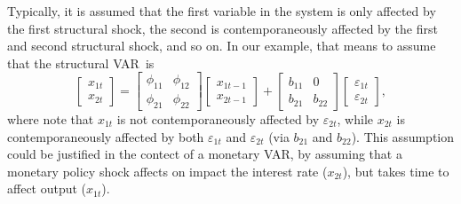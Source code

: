 \documentclass[10pt]{article}
\begin{document}
Typically, it is assumed that the first variable in the system is only
affected by the first structural shock, the second is contemporaneously
affected by the first and second structural shock, and so on. In our
example, that means to assume that the structural VAR\ is 
\begin{equation}
\left[ 
\begin{array}{c}
x_{1t} \\ 
x_{2t}%
\end{array}%
\right] =%
\begin{bmatrix}
\phi _{11} & \phi _{12} \\ 
\phi _{21} & \phi _{22}%
\end{bmatrix}%
\left[ 
\begin{array}{c}
x_{1t-1} \\ 
x_{2t-1}%
\end{array}%
\right] +\left[ 
\begin{array}{cc}
b_{11} & 0 \\ 
b_{21} & b_{22}%
\end{array}%
\right] 
\begin{bmatrix}
\varepsilon _{1t} \\ 
\varepsilon _{2t}%
\end{bmatrix}%
,  \label{eq:struct_var_ch}
\end{equation}%
where note that $x_{1t}$ is not contemporaneously affected by $\varepsilon
_{2t}$, while $x_{2t}$ is contemporaneously affected by both $\varepsilon
_{1t}$ and $\varepsilon _{2t}$ (via $b_{21}$ and $b_{22}$). This assumption
could be justified in the contect of a monetary VAR, by assuming that a
monetary policy shock affects on impact the interest rate ($x_{2t}$), but
takes time to affect output ($x_{1t}$).
\end{document}
